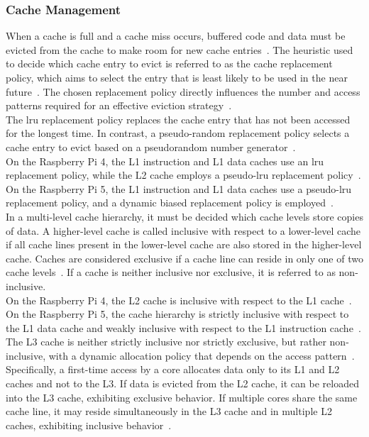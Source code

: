     \subsubsection{Cache Management} \label{subsubsec:cache-management}
        When a cache is full and a cache miss occurs, buffered code and data must be evicted from the cache to make room for new 
        cache entries~\cite{paperARMageddon}. The heuristic used to decide which cache entry to evict is referred to as the cache replacement 
        policy, which aims to select the entry that is least likely to be used in the near future~\cite{paperTriggeringRHHardwareFault}. The chosen 
        replacement policy directly influences the number and access patterns required for an effective eviction 
        strategy~\cite{thesisCacheAttacksandRH}.
        \\
        The \gls{lru} replacement policy replaces the cache entry that has not been accessed for 
        the longest time. In contrast, a pseudo-random replacement policy selects a cache entry to evict based 
        on a pseudorandom number generator~\cite{thesisCacheAttacksandRH}.
        \\
        On the Raspberry Pi 4, the L1 instruction and L1 data caches use an \gls{lru} replacement policy, while the L2 
        cache employs a pseudo-\gls{lru} replacement policy~\cite{webRPi4Hardware, docCortexA72}. On the Raspberry Pi 5, the L1 instruction and 
        L1 data caches use a pseudo-\gls{lru} replacement policy, and a dynamic biased replacement policy is 
        employed~\cite{docCortexA76}.
        \\
        In a multi-level cache hierarchy, it must be decided which cache levels store copies of data. A 
        higher-level cache is called inclusive with respect to a lower-level cache if all cache lines present in 
        the lower-level cache are also stored in the higher-level cache. Caches are considered exclusive if 
        a cache line can reside in only one of two cache levels~\cite{thesisExploitingMicroOpt, thesisCacheAttacksandRH}. If a cache is neither inclusive nor exclusive, 
        it is referred to as non-inclusive.
        \\
        On the Raspberry Pi 4, the L2 cache is inclusive with respect to the L1 cache~\cite{docCortexA72}. On the Raspberry Pi 5, the 
        cache hierarchy is strictly inclusive with respect to the L1 data cache and weakly inclusive with respect 
        to the L1 instruction cache~\cite{docCortexA76}. The L3 cache is neither strictly inclusive nor strictly exclusive, but 
        rather non-inclusive, with a dynamic allocation policy that depends on the access pattern~\cite{docSharedUnit, webInclusivness}. 
        Specifically, a first-time access by a core allocates data only to its L1 and L2 caches and not to the 
        L3. If data is evicted from the L2 cache, it can be reloaded into the L3 cache, exhibiting exclusive behavior. 
        If multiple cores share the same cache line, it may reside simultaneously in the L3 cache and in multiple 
        L2 caches, exhibiting inclusive behavior~\cite{docSharedUnit, webInclusivness}.

